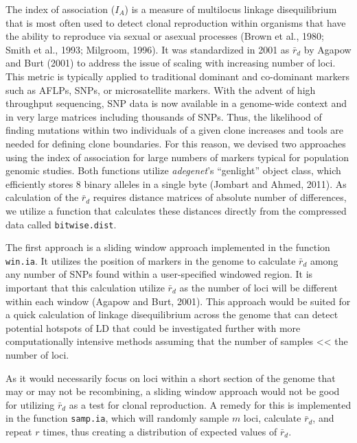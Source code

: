 \documentclass{frontiersSCNS} %
\begin{document}
The index of association (\(I_A\)) is a measure of multilocus linkage
disequilibrium that is most often used to detect clonal reproduction
within organisms that have the ability to reproduce via sexual or
asexual processes (Brown et al., 1980; Smith et al., 1993; Milgroom,
1996). It was standardized in 2001 as \(\bar{r}_d\) by Agapow and Burt
(2001) to address the issue of scaling with increasing number of loci.
This metric is typically applied to traditional dominant and co-dominant
markers such as AFLPs, SNPs, or microsatellite markers. With the advent
of high throughput sequencing, SNP data is now available in a
genome-wide context and in very large matrices including thousands of
SNPs. Thus, the likelihood of finding mutations within two individuals
of a given clone increases and tools are needed for defining clone
boundaries. For this reason, we devised two approaches using the index
of association for large numbers of markers typical for population
genomic studies. Both functions utilize \emph{adegenet}'s ``genlight''
object class, which efficiently stores 8 binary alleles in a single byte
(Jombart and Ahmed, 2011). As calculation of the \(\bar{r}_d\) requires
distance matrices of absolute number of differences, we utilize a
function that calculates these distances directly from the compressed
data called \texttt{bitwise.dist}.

The first approach is a sliding window approach implemented in the
function \texttt{win.ia}. It utilizes the position of markers in the
genome to calculate \(\bar{r}_d\) among any number of SNPs found within
a user-specified windowed region. It is important that this calculation
utilize \(\bar{r}_d\) as the number of loci will be different within
each window (Agapow and Burt, 2001). This approach would be suited for a
quick calculation of linkage disequilibrium across the genome that can
detect potential hotspots of LD that could be investigated further with
more computationally intensive methods assuming that the number of
samples \textless{}\textless{} the number of loci.

As it would necessarily focus on loci within a short section of the
genome that may or may not be recombining, a sliding window approach
would not be good for utilizing \(\bar{r}_d\) as a test for clonal
reproduction. A remedy for this is implemented in the function
\texttt{samp.ia}, which will randomly sample \(m\) loci, calculate
\(\bar{r}_d\), and repeat \(r\) times, thus creating a distribution of
expected values of \(\bar{r}_d\).
\end{document}
